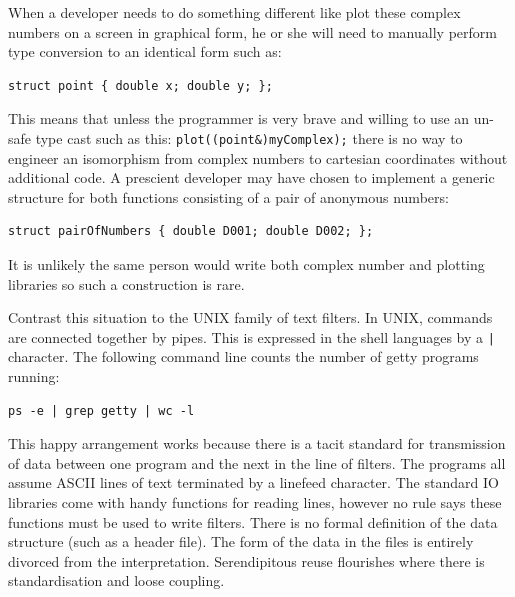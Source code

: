 \documentclass[a4paper,12pt,dvips]{article}
\begin{document}
When a developer needs to do something different like plot these complex numbers on a screen in graphical form, he or she will need to manually perform type conversion to an identical form such as: 
\begin{verbatim}
struct point { double x; double y; };
\end{verbatim}
This means that unless the programmer is very brave and willing to use an un-safe type cast such as this: \verb*|plot((point&)myComplex);|   there is no way to engineer an isomorphism from complex numbers to cartesian coordinates without additional code. A prescient developer may have chosen to implement a generic structure for both functions consisting of a pair of anonymous numbers:
\begin{verbatim}
struct pairOfNumbers { double D001; double D002; };
\end{verbatim}
It is unlikely the same person would write both complex number and plotting libraries so such a construction is rare. 

Contrast this situation to the UNIX family of text filters. In UNIX, commands are connected together by pipes. This is expressed in the shell languages by a \texttt{|} character. The following command line counts the number of getty programs running:
\begin{verbatim}
ps -e | grep getty | wc -l
\end{verbatim}
This happy arrangement works because there is a tacit standard for transmission of data between one program and the next in the line of filters. The programs all assume ASCII lines of text terminated by a linefeed character. The standard IO libraries come with handy functions for reading lines, however no rule says these functions must be used to write filters.  There is no formal definition of the data structure (such as a header file). The form of the data in the files is entirely divorced from the interpretation. Serendipitous reuse flourishes where there is standardisation and loose coupling.
\end{document}
